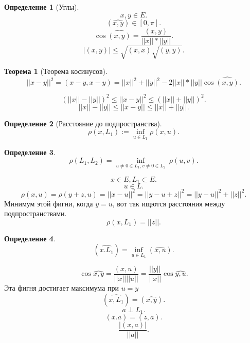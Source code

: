 \documentclass{scrartcl}
\newtheorem{theorem}{Теорема}
\newtheorem{definition}{Определение}
\begin{document}
\begin{definition}[Углы]
    \[
    x,y \in E
    .\] 
    \[
        (\widehat{x,y}) \in [0, \pi]
    .\] 
    \[
        \cos{\widehat{( x,y )}} = \frac{(x,y)}{||x|| * ||y||}
    .\] 
    \[
    |(x,y)| \le  \sqrt{(x,x)}  \sqrt{(y,y)} 
    .\] 
\end{definition}
\begin{theorem}[Теорема косинусов]
    \[
        ||x - y|| ^{2} = (x-y,x-y) = ||x||^{2} + ||y||^{2} - 2||x|| *||y|| \cos{\widehat{( x,y )}}
    .\] 
\end{theorem}
\[
  (||x|| - ||y||)^{2} \le  ||x - y|| ^{2} \le  (||x|| + ||y||)^{2}
.\] 
\[
||x || - || y|| \le  ||x - y|| \le  ||x|| + ||y||
.\] 
\begin{definition}[Расстояние до подпространства]
    \[
        \rho(x,L_1) := \inf_{u \in L_1}{\rho(x,u)}
    .\] 
\end{definition}
\begin{definition}
    \[
        \rho( L_1,L_2 ) = \inf_{u \neq 0 \in L_1 , v \neq 0 \in L_2}~ \rho(u,v)
    .\] 
\end{definition}
\[
x \in E, L_1 \subset E
.\] 
\[
u \in L
.\] 
\[
    \rho(x,u) = \rho(y + z,u)= ||x - u||^{2} = ||y - u + z||^{2} = ||y - u||^{2} + ||z||^{2}
.\]
Минимум этой фигни, когда $y = u$, вот так ищются расстояния между подпространствами.
 \[
\rho(x,L_1) = ||z||
.\] 
\begin{definition}
    \[
        (\widehat{x.L_1}) = \inf_{u \in L_1} (\widehat{x,u})
    .\] 
\end{definition}
\[
    \cos{\widehat{x,y}} = \frac{(x,u)}{||x|| ||u||} = \frac{||y||}{||x||} \cos{\widehat{y,u}}
.\] 
Эта фигня достигает максимума при $u = y$
\[
    (\widehat{x,L_1}) = (\widehat{x,y})
.\] 
\[
a \perp L_1
.\] 
\[
    (x.a) = (z,a)
.\] 
\[
\frac{|(x,a)|}{||a||}
.\] 
\end{document}

